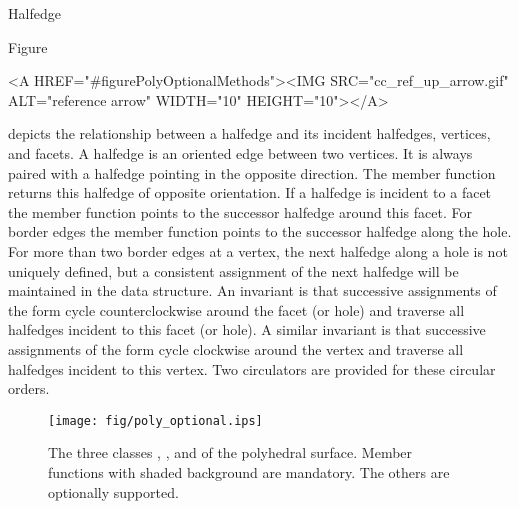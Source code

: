 
\ccRefPageBegin



\begin{ccRefClass}{Halfedge}

\ccDefinition
  
Figure~\begin{ccHtmlOnly}
  <A HREF="#figurePolyOptionalMethods"><IMG 
  SRC="cc_ref_up_arrow.gif" ALT="reference arrow" WIDTH="10" HEIGHT="10"></A>
\end{ccHtmlOnly}
depicts the relationship between a halfedge and its incident
halfedges, vertices, and facets.  A halfedge is an oriented edge
between two vertices. It is always paired with a halfedge pointing in
the opposite direction. The  member function returns
this halfedge of opposite orientation. If a halfedge is incident to a
facet the  member function points to the successor
halfedge around this facet. For border edges the  member
function points to the successor halfedge along the hole. For more
than two border edges at a vertex, the next halfedge along a hole is
not uniquely defined, but a consistent assignment of the next halfedge
will be maintained in the data structure. An invariant is that
successive assignments of the form  cycle
counterclockwise around the facet (or hole) and traverse all halfedges
incident to this facet (or hole). A similar invariant is that successive
assignments of the form  cycle
clockwise around the vertex and traverse all halfedges incident to
this vertex. Two circulators are provided for these circular orders.

\begin{ccTexOnly}
    \begin{figure}[bht]
        \begin{center}
          \parbox{\textwidth}{%
              \texttt{[image: fig/poly\_optional.ips]}%
          }
        \end{center}
        \caption{The three classes \protect{}, 
          \protect{}, and 
          \protect{} of the polyhedral surface. Member
          functions with shaded background are mandatory. The others
          are optionally supported.}
        \label{figurePolyOptionalMethods}
    \end{figure}
\end{ccTexOnly}


\end{ccRefClass}
